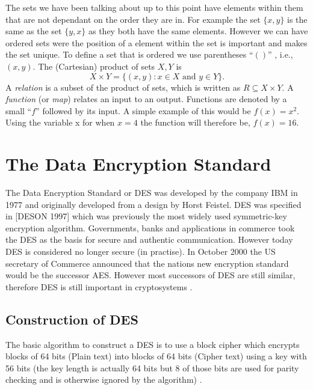 \documentclass[11pt,a4paper, notitlepage]{report}
\begin{document}
The sets we have been talking about up to this point have elements within them that are not dependant on the order they are in. For example the set $\{x,y\}$ is the same as the set $\{y, x\}$ as they both have the same elements. However we can have ordered sets were the position of a element within the set is important and makes the set unique. To define a set that is ordered we use parentheses  ``$()$'' , i.e., $(x,y)$.
The (Cartesian) product of sets $X, Y$ is
\begin{displaymath}
  X \times Y = \{(x,y) : x \in X \text{ and } y \in Y\}.
\end{displaymath}
A \emph{relation} is a subset of the product of sets, which is written as $R \subseteq X \times Y$. A \emph{function} (or \emph{map}) relates an input to an output. Functions are denoted by a small ``$f$'' followed by its input. A simple example of this would be $f(x) = x^2$. Using the variable x for when $x=4$ the function will therefore be, $f(x) = 16$.















\chapter{The Data Encryption Standard}
\label{cha:DES}

The Data Encryption Standard  or DES was developed by the company IBM in 1977 and originally developed from a design by Horst Feistel. DES was specified in [DESON 1997] which was previously the most widely used symmetric-key encryption algorithm. Governments, banks and applications in commerce took the DES as the basis for secure and authentic communication. However today DES is considered no longer secure (in practise). In October 2000 the US secretary of Commerce announced that the nations new encryption standard would be the successor AES. However most successors of DES are still similar, therefore DES is still important in cryptosystems \cite{DBLP:series/isc/DelfsK07} \cite{DBLP:books/sp/Buchmann02}.

\section{Construction of DES}
\label{sec:conDES}

The basic algorithm to construct a DES is to use a block cipher which encrypts blocks of 64 bits (Plain text) into blocks of 64 bits (Cipher text) using a key with 56 bits (the key length is actually 64 bits but 8 of those bits are used for parity checking and is otherwise ignored by the algorithm) \cite{Fabio2000LogicalSAT}.
\end{document}
